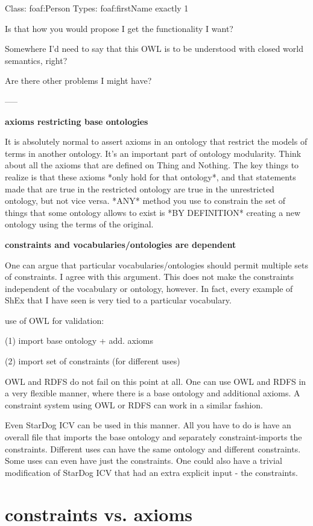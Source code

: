 \documentclass{llncs}
\begin{document}
    Class: foaf:Person
       Types: foaf:firstName exactly 1
 
Is that how you would propose I get the functionality I want?
 
Somewhere I'd need to say that this OWL is to be understood with closed
world semantics, right?
 
Are there other problems I might have?
 
-----

\textbf{axioms restricting base ontologies}

It is absolutely normal to assert axioms in an ontology that restrict the models of terms in another ontology. It's an important part of ontology modularity.
Think about all the axioms that are defined on Thing and Nothing.
The key things to realize is that these axioms *only hold for that ontology*, and that statements made that are true in the restricted ontology are true in the unrestricted ontology, but not vice versa.  
*ANY* method you use to constrain the set of things that some ontology allows to exist is *BY DEFINITION* creating a new ontology using the terms of the original.

\textbf{constraints and vocabularies/ontologies are dependent}

One can argue that particular vocabularies/ontologies should permit multiple sets of constraints.  I agree with this argument.  This does not make the constraints independent of the vocabulary or ontology, however.  In fact, every example of ShEx that I have seen is very tied to a particular vocabulary.

use of OWL for validation:

(1) import base ontology + add. axioms

(2) import set of constraints (for different uses)

OWL and RDFS do not fail on this point at all.  One can use OWL and RDFS in a very flexible manner, where there is a base ontology and additional axioms.  A constraint system using OWL or RDFS can work in a similar fashion.

Even StarDog ICV can be used in this manner.  All you have to do is have an overall file that imports the base ontology and separately constraint-imports the constraints.  Different uses can have the same ontology and different constraints.  Some uses can even have just the constraints.  One could also have a trivial modification of StarDog ICV that had an extra explicit input - the constraints.

\section{constraints vs. axioms}
\end{document}
